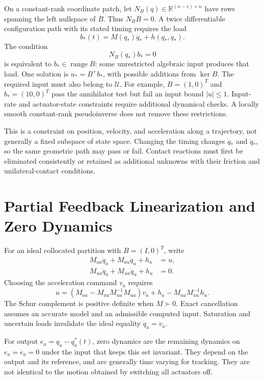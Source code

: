 On a constant-rank coordinate patch, let $N_B(q)\in\mathbb R^{(n-r)\times n}$
have rows spanning the left nullspace of $B$. Thus $N_BB=0$. A twice
differentiable configuration path with its stated timing requires the load
\begin{equation}
b_*(t)=M(q_*)\ddot q_*+h(q_*,\dot q_*).
\end{equation}
The condition
\begin{equation}
N_B(q_*)b_*=0
\label{eq:unactuated_dynamics}
\end{equation}
is equivalent to $b_*\in\operatorname{range}B$: some unrestricted algebraic
input produces that load. One solution is $u_*=B^+b_*$, with possible additions
from $\ker B$. The required input must also belong to $\mathcal U$.
For example, $B=(1,0)^T$ and $b_*=(10,0)^T$ pass the annihilator test but fail
an input bound $|u|\leq1$. Input-rate and actuator-state constraints require
additional dynamical checks. A locally smooth constant-rank pseudoinverse does
not remove these restrictions.

This is a constraint on position, velocity, and acceleration along a trajectory,
not generally a fixed subspace of state space. Changing the timing changes
$\dot q_*$ and $\ddot q_*$, so the same geometric path may pass or fail.
Contact reactions must first be eliminated consistently or retained as additional
unknowns with their friction and unilateral-contact conditions.

\section{Partial Feedback Linearization and Zero Dynamics}

For an ideal collocated partition with $B=(I,0)^T$, write
\begin{align}
M_{aa}\ddot q_a+M_{au}\ddot q_u+h_a&=u,\\
M_{ua}\ddot q_a+M_{uu}\ddot q_u+h_u&=0.
\end{align}
Choosing the acceleration command $v_a$ requires
\begin{equation}
u=(M_{aa}-M_{au}M_{uu}^{-1}M_{ua})v_a
  +h_a-M_{au}M_{uu}^{-1}h_u.
\end{equation}
The Schur complement is positive definite when $M\succ0$. Exact cancellation
assumes an accurate model and an admissible computed input. Saturation and
uncertain loads invalidate the ideal equality $\ddot q_a=v_a$.

For output $e_a=q_a-q_a^*(t)$, zero dynamics are the remaining dynamics on
$e_a=\dot e_a=0$ under the input that keeps this set invariant. They depend on
the output and its reference, and are generally time varying for tracking.
They are not identical to the motion obtained by switching all actuators off.

